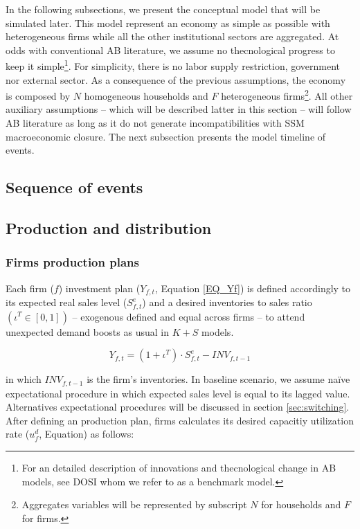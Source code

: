 \documentclass{SelfArx}
\begin{document}
In the following subsections, we present the conceptual model that will be simulated later.
This model represent an economy as simple as possible with heterogeneous firms while all the other institutional sectors are aggregated.
At odds with conventional AB literature, we assume no thecnological progress to keep it simple\footnote{For an detailed description of innovations and thecnological change in AB models, see DOSI whom we refer to as a benchmark model.}.
For simplicity, there is no labor supply restriction, government nor external sector.
As a consequence of the previous assumptions, the economy is composed by \(N\) homogeneous households and \(F\) heterogeneous firms\footnote{Aggregates variables will be represented by subscript \(N\) for households and \(F\) for firms.}.
All other auxiliary assumptions -- which will be described latter in this section -- will follow AB literature as long as it do not generate incompatibilities with SSM macroeconomic closure.
The next subsection presents the model timeline of events.

\subsection{Sequence of events}
\label{sec:org64ba85f}



\subsection{Production and distribution}
\label{sec:org3325c34}


\subsubsection{Firms production plans}
\label{sec:org94a8402}

Each firm (\(f\)) investment plan (\(Y_{f,t}\), Equation \ref{EQ_Yf}) is defined accordingly to its expected real sales level (\(S^{e}_{f,t}\)) and a desired inventories to sales ratio \((\iota^{T} \in [0,1])\) -- exogenous defined and equal across firms -- to attend unexpected demand boosts as usual in \(K+S\) models.

\begin{latex}
\begin{equation}
\label{Ch_super_EQ_Yf}
Y_{f,t} = (1+\iota^{T})\cdot S^{e}_{f,t} - INV_{f,t-1}
\end{equation}
\end{latex}
in which \(INV_{f,t-1}\) is the firm's inventories.
In baseline scenario, we assume naïve expectational procedure in which expected sales level is equal to its lagged value.
Alternatives expectational procedures will be discussed in section \ref{sec:switching}.
After defining an production plan, firms calculates its desired capacitiy utilization rate (\(u^{d}_{f}\), Equation) as follows:
\end{document}
